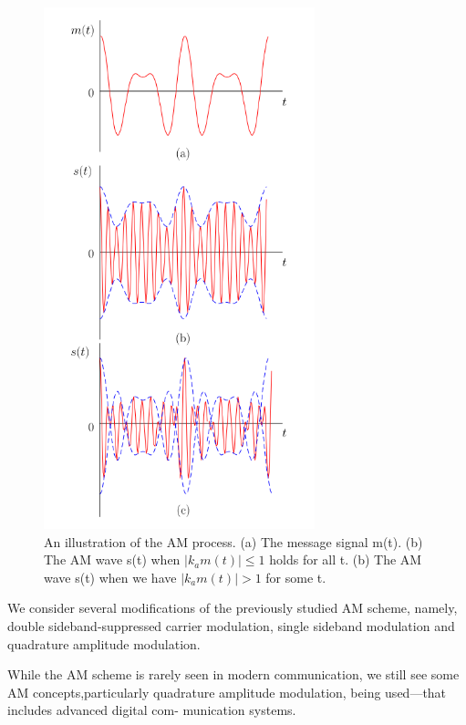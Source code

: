 \begin{figure}[h!]
  \centering
  \includegraphics[width = 0.7\textwidth]{figures/AMgraph.png}

  \caption{An illustration of the AM process. (a) The message signal m(t). (b) The AM wave s(t)
when $|k_a m(t)| \leq 1$ holds for all t. (b) The AM wave s(t) when we have $|k_a m(t)| > 1$ for some t.}
  \label{fig:f2}
\end{figure}


We consider several modifications of the previously studied AM scheme, namely, double sideband-suppressed carrier modulation, single sideband modulation and quadrature amplitude modulation.

While the AM scheme is rarely seen in modern communication, we still see some AM concepts,particularly quadrature amplitude modulation, being used—that includes advanced digital com-
munication systems.


